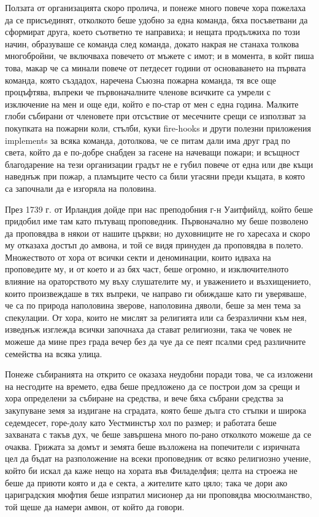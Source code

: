\documentclass[12pt]{book}
\begin{document}
Ползата от организацията скоро пролича, и понеже много повече хора пожелаха да се присъединят, отколкото беше удобно за една команда, бяха посъветвани да сформират друга, което съответно те направиха; и нещата продължиха по този начин, образуваше се команда след команда, докато накрая не станаха толкова многобройни, че включваха повечето от мъжете с имот; и в момента, в койт пиша това, макар че са минали повече от петдесет години от основаването на първата команда, която създадох, наречена Съюзна пожарна команда, тя все още процъфтява, въпреки че първоначалните членове всичките са умрели с изключение на мен и още еди, който е по-стар от мен с една година. Малките глоби събирани от членовете при отсъствие от месечните срещи се използват за покупката на пожарни коли, стълби, куки fire-hooks и други полезни приложения implements за всяка команда, дотолкова, че се питам дали има друг град по света, който да е по-добре снабден за гасене на начеващи пожари; и всъщност благодарение на тези организации градът не е губил повече от една или две къщи наведнъж при пожар, а пламъците често са били угасяни преди къщата, в която са започнали да е изгоряла на половина.

През 1739 г. от Ирландия дойде при нас преподобния г-н Уаитфийлд, който беше придобил име там като пътуващ проповедник. Първоначално му беше позволено да проповядва в някои от нашите църкви; но духовниците не го харесаха и скоро му отказаха достъп до амвона, и той се видя принуден да проповядва в полето. Множеството от хора от всички секти и деноминации, които идваха на проповедите му, и от което и аз бях част, беше огромно, и изключителното влияние на ораторството му въху слушателите му, и уважението и възхищението, които произвеждаше в тях въпреки, че направо ги обиждаше като ги уверяваше, че са по природа наполовина зверове, наполовина дяволи, беше за мен тема за спекулации. От хора, които не мислят за религията или са безразлични към нея, изведнъж изглежда всички започнаха да стават религиозни, така че човек не можеше да мине през града вечер без да чуе да се пеят псалми сред различните семейства на всяка улица. 

Понеже събиранията на открито се оказаха неудобни поради това, че са изложени на несгодите на времето, едва беше предложено да се построи дом за срещи и хора определени за събиране на средства, и вече бяха събрани средства за закупуване земя за издигане на сградата, която беше дълга сто стъпки и широка седемдесет, горе-долу като Уестминстър хол по размер; и работата беше захваната с такъв дух, че беше завършена много по-рано отколкото можеше да се очаква. Грижата за домът и земята беше възложена на попечители с изричната цел да бъдат на разположение на всеки проповедник от всяко религиозно учение, който би искал да каже нещо на хората във Филаделфия; целта на строежа не беше да приюти която и да е секта, а жителите като цяло; така че дори ако цариградския мюфтия беше изпратил мисионер да ни проповядва мюсюлманство, той щеше да намери амвон, от който да говори.
\end{document}
